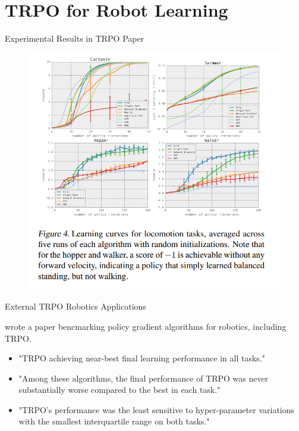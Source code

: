 \documentclass{beamer}
\begin{document}
\section{TRPO for Robot Learning}
\begin{frame}{Experimental Results in TRPO Paper}    

\begin{figure}
    \centering
    \includegraphics[width=0.8\linewidth]{trpo_experimental_results.png}
    \label{fig:exp_results}
\end{figure}


\end{frame}

\begin{frame}{External TRPO Robotics Applications}    

\cite{benchmark_robots} wrote a paper bencmarking policy gradient algorithms for robotics, including TRPO. 
\begin{itemize}
    \item "TRPO achieving near-best final learning performance in all tasks." 
    \item "Among these algorithms, the final performance of TRPO was never substantially worse compared to the best in each task."
    \item  "TRPO’s performance was the least sensitive to hyper-parameter variations with the smallest interquartile range on both tasks."
\end{itemize}

\end{frame}
\end{document}
